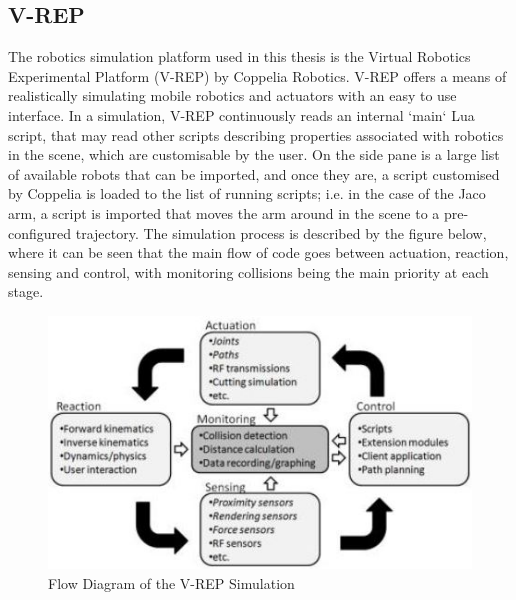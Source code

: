 \documentclass[12pt,openany,a4paper]{book}
\begin{document}
\subsection{V-REP}
The robotics simulation platform used in this thesis is the Virtual Robotics Experimental Platform (V-REP) by Coppelia Robotics. V-REP offers a means of realistically simulating mobile robotics and actuators with an easy to use interface. In a simulation, V-REP continuously reads an internal `main` Lua script, that may read other scripts describing properties associated with robotics in the scene, which are customisable by the user. On the side pane is a large list of available robots that can be imported, and once they are, a script customised by Coppelia is loaded to the list of running scripts; i.e. in the case of the Jaco arm, a script is imported that moves the arm around in the scene to a pre-configured trajectory. The simulation process is described by the figure below, where it can be seen that the main flow of code goes between actuation, reaction, sensing and control, with monitoring collisions being the main priority at each stage.

\begin{center}
\begin{figure}[htb]
  \includegraphics[width=\linewidth]{vrep_simulation_diagram.jpg}
\caption{Flow Diagram of the V-REP Simulation}
\end{figure}
\end{center}
\end{document}
